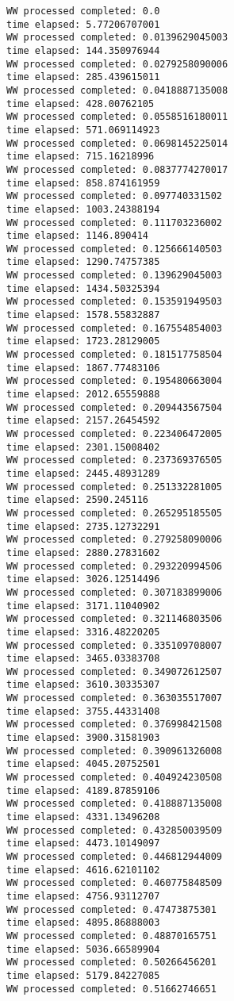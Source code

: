 \documentclass[11pt]{article}
\begin{document}
    \begin{Verbatim}[commandchars=\\\{\}]
WW processed completed: 0.0
time elapsed: 5.77206707001
WW processed completed: 0.0139629045003
time elapsed: 144.350976944
WW processed completed: 0.0279258090006
time elapsed: 285.439615011
WW processed completed: 0.0418887135008
time elapsed: 428.00762105
WW processed completed: 0.0558516180011
time elapsed: 571.069114923
WW processed completed: 0.0698145225014
time elapsed: 715.16218996
WW processed completed: 0.0837774270017
time elapsed: 858.874161959
WW processed completed: 0.097740331502
time elapsed: 1003.24388194
WW processed completed: 0.111703236002
time elapsed: 1146.890414
WW processed completed: 0.125666140503
time elapsed: 1290.74757385
WW processed completed: 0.139629045003
time elapsed: 1434.50325394
WW processed completed: 0.153591949503
time elapsed: 1578.55832887
WW processed completed: 0.167554854003
time elapsed: 1723.28129005
WW processed completed: 0.181517758504
time elapsed: 1867.77483106
WW processed completed: 0.195480663004
time elapsed: 2012.65559888
WW processed completed: 0.209443567504
time elapsed: 2157.26454592
WW processed completed: 0.223406472005
time elapsed: 2301.15008402
WW processed completed: 0.237369376505
time elapsed: 2445.48931289
WW processed completed: 0.251332281005
time elapsed: 2590.245116
WW processed completed: 0.265295185505
time elapsed: 2735.12732291
WW processed completed: 0.279258090006
time elapsed: 2880.27831602
WW processed completed: 0.293220994506
time elapsed: 3026.12514496
WW processed completed: 0.307183899006
time elapsed: 3171.11040902
WW processed completed: 0.321146803506
time elapsed: 3316.48220205
WW processed completed: 0.335109708007
time elapsed: 3465.03383708
WW processed completed: 0.349072612507
time elapsed: 3610.30335307
WW processed completed: 0.363035517007
time elapsed: 3755.44331408
WW processed completed: 0.376998421508
time elapsed: 3900.31581903
WW processed completed: 0.390961326008
time elapsed: 4045.20752501
WW processed completed: 0.404924230508
time elapsed: 4189.87859106
WW processed completed: 0.418887135008
time elapsed: 4331.13496208
WW processed completed: 0.432850039509
time elapsed: 4473.10149097
WW processed completed: 0.446812944009
time elapsed: 4616.62101102
WW processed completed: 0.460775848509
time elapsed: 4756.93112707
WW processed completed: 0.47473875301
time elapsed: 4895.86888003
WW processed completed: 0.48870165751
time elapsed: 5036.66589904
WW processed completed: 0.50266456201
time elapsed: 5179.84227085
WW processed completed: 0.51662746651

\end{Verbatim}
\end{document}
